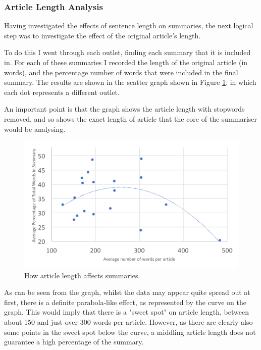 \documentclass[12pt]{article}
\begin{document}
\subsubsection{Article Length Analysis}

Having investigated the effects of sentence length on summaries, the next logical step was to investigate the effect of the original article's length.

To do this I went through each outlet, finding each summary that it is included in. For each of these summaries I recorded the length of the original article (in words), and the percentage number of words that were included in the final summary. The results are shown in the scatter graph shown in Figure \ref{articlelength}, in which each dot represents a different outlet.

An important point is that the graph shows the article length with stopwords removed, and so shows the exact length of article that the core of the summariser would be analysing.

\begin{figure}[ht!]
  \centering
    \includegraphics[scale=0.5]{articlelength.png}
   \caption[A graph depicting responses to the User Interface Survey]{How article length affects summaries.}
   \label{articlelength}
\end{figure}

As can be seen from the graph, whilst the data may appear quite spread out at first, there is a definite parabola-like effect, as represented by the curve on the graph. This would imply that there is a "sweet spot" on article length, between about 150 and just over 300 words per article. However, as there are clearly also some points in the sweet spot below the curve, a middling article length does not guarantee a high percentage of the summary.
\end{document}
